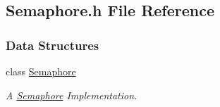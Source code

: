 \hypertarget{a00003}{}\subsection{Semaphore.\+h File Reference}
\label{a00003}
\subsubsection*{Data Structures}
\begin{DoxyCompactItemize}
\item 
class \hyperlink{a00001}{Semaphore}
\begin{DoxyCompactList}\small\item\em A \hyperlink{a00001}{Semaphore} Implementation. \end{DoxyCompactList}\end{DoxyCompactItemize}
